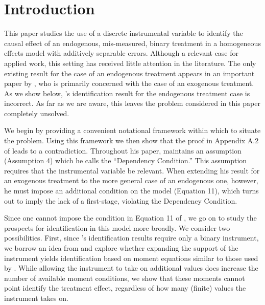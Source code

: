 \section{Introduction}

This paper studies the use of a discrete instrumental variable to identify the causal effect of an endogenous, mis-measured, binary treatment in a homogeneous effects model with additively separable errors.
Although a relevant case for applied work, this setting has received little attention in the literature.
The only existing result for the case of an endogenous treatment appears in an important paper by \cite{Mahajan}, who is primarily concerned with the case of an exogenous treatment.
As we show below, \citeauthor{Mahajan}'s identification result for the endogenous treatment case is incorrect.
As far as we are aware, this leaves the problem considered in this paper completely unsolved.

We begin by providing a convenient notational framework within which to situate the problem.
Using this framework we then show that the proof in Appendix A.2 of \cite{Mahajan} leads to a contradiction.
Throughout his paper, \cite{Mahajan} maintains an assumption (Assumption 4) which he calls the ``Dependency Condition.'' 
This assumption requires that the instrumental variable be relevant.
When extending his result for an exogenous treatment to the more general case of an endogenous one, however, he must impose an additional condition on the model (Equation 11), which turns out to imply the lack of a first-stage, violating the Dependency Condition.

Since one cannot impose the condition in Equation 11 of \cite{Mahajan}, we go on to study the prospects for identification in this model more broadly.
We consider two possibilities.
First, since \citeauthor{Mahajan}'s identification results require only a binary instrument,  we borrow an idea from \cite{Lewbel} and explore whether expanding the support of the instrument yields identification based on moment equations similar to those used by \cite{Mahajan}.
While allowing the instrument to take on additional values does increase the number of available moment conditions, we show that these moments cannot point identify the treatment effect, regardless of how many (finite) values the instrument takes on.

